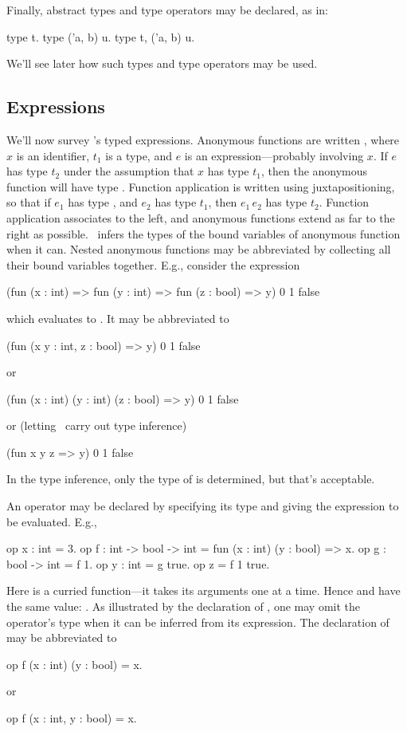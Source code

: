 Finally, abstract types and type operators may be declared, as in:
\begin{easycrypt}{}{}
type t.
type ('a, b) u.
type t, ('a, b) u.
\end{easycrypt}
We'll see later how such types and type operators may be used.

\subsection{Expressions}

We'll now survey \EasyCrypt's typed expressions. Anonymous functions
are written , where $x$ is an identifier,
$t_1$ is a type, and $e$ is an expression---probably involving $x$.
If $e$ has type $t_2$ under the assumption that $x$ has type $t_1$,
then the anonymous function will have type .
Function application is written using juxtapositioning, so that if
$e_1$ has type , and $e_2$ has type $t_1$, then
$e_1\,e_2$ has type $t_2$. Function application associates to the
left, and anonymous functions extend as far to the right as possible.
\EasyCrypt\ infers the types of the bound variables of anonymous function
when it can. Nested anonymous functions may be abbreviated by
collecting all their bound variables together. E.g., consider the
expression
\begin{easycrypt}{}{}
(fun (x : int) => fun (y : int) => fun (z : bool) => y) 0 1 false
\end{easycrypt}
which evaluates to . It may be abbreviated to
\begin{easycrypt}{}{}
(fun (x y : int, z : bool) => y) 0 1 false
\end{easycrypt}
or
\begin{easycrypt}{}{}
(fun (x : int) (y : int) (z : bool) => y) 0 1 false
\end{easycrypt}
or (letting \EasyCrypt\ carry out type inference)
\begin{easycrypt}{}{}
(fun x y z => y) 0 1 false
\end{easycrypt}
In the type inference, only the type of  is determined, but
that's acceptable.

An operator may be declared by specifying its type and giving the
expression to be evaluated. E.g.,
\begin{easycrypt}{}{}
op x : int = 3.
op f : int -> bool -> int = fun (x : int) (y : bool) => x.
op g : bool -> int = f 1.
op y : int = g true.
op z = f 1 true.
\end{easycrypt}
Here  is a curried function---it takes its arguments one
at a time. Hence  and  have the same value: .
As illustrated by the declaration of , one may omit the
operator's type when it can be inferred from its expression.
The declaration of  may be abbreviated to
\begin{easycrypt}{}{}
op f (x : int) (y : bool) = x.
\end{easycrypt}
or
\begin{easycrypt}{}{}
op f (x : int, y : bool) = x.
\end{easycrypt}

